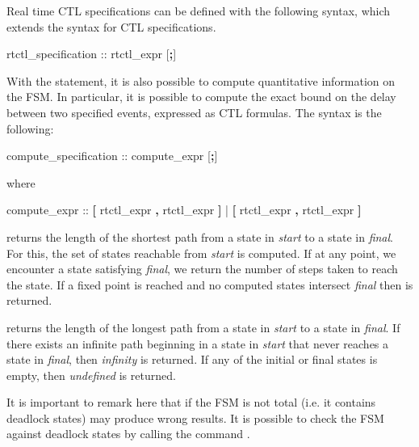 %
Real time CTL specifications can be defined with the following syntax,
which extends the syntax for CTL specifications.
%
\begin{Grammar}
rtctl_specification ::  rtctl_expr [\textbf{;}]
\end{Grammar}
%
With the  statement, it is also possible to compute
quantitative information on the FSM. 
%
In particular, it is possible to compute the exact bound on the delay
between two specified events, expressed as CTL formulas. 
%
The syntax is the following:
%
\begin{Grammar}
compute_specification ::  compute_expr [\textbf{;}]
\end{Grammar}
%
where
%
\begin{Grammar}
compute_expr ::  \textbf{[} rtctl_expr \textbf{,} rtctl_expr \textbf{]}
              |  \textbf{[} rtctl_expr \textbf{,} rtctl_expr \textbf{]}
\end{Grammar}
%
 returns the length of the shortest path from a state
in \textit{start} to a state in \textit{final}.
%
For this, the set of states reachable from \textit{start} is
computed. 
%
If at any point, we encounter a state satisfying \textit{final}, we
return the number of steps taken to reach the state. 
%
If a fixed point is reached and no computed states intersect
\textit{final} then  is returned.

\noindent{} returns the length of the longest path from a state
in \textit{start} to a state in \textit{final}. 
%
If there exists an infinite path beginning in a state in
\textit{start} that never reaches a state in \textit{final}, then
\textit{infinity} is returned. If any of the initial or final states 
is empty, then \textit{undefined} is returned.

It is important to remark here that if the FSM is not total (i.e. it
contains deadlock states)  may produce wrong
results. It is possible to check the FSM against deadlock states by
calling the command .


